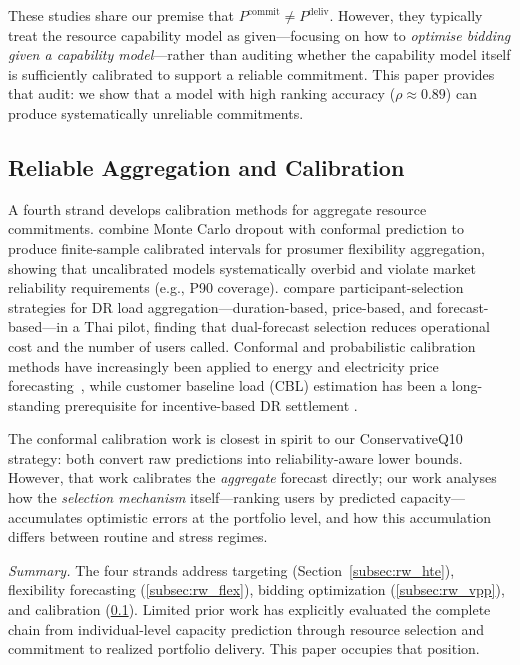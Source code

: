 \documentclass[utf8]{FrontiersinHarvard}
\newcommand{\Pcommit}{P^{\mathrm{commit}}}
\newcommand{\Pdeliv}{P^{\mathrm{deliv}}}
\begin{document}
These studies share our premise that
$\Pcommit \neq \Pdeliv$. However, they typically treat the
resource capability model as given---focusing on how to
\emph{optimise bidding given a capability model}---rather than
auditing whether the capability model itself is sufficiently
calibrated to support a reliable commitment. This paper
provides that audit: we show that a model with high ranking
accuracy ($\rho \approx 0.89$) can produce systematically unreliable
commitments.

\subsection{Reliable Aggregation and Calibration}
\label{subsec:rw_calib}

A fourth strand develops calibration methods for aggregate
resource commitments.
\citep{conformal2026prosumer} combine Monte Carlo dropout
with conformal prediction to produce finite-sample calibrated
intervals for prosumer flexibility aggregation, showing that
uncalibrated models systematically overbid and violate
market reliability requirements (e.g., P90 coverage).
\citep{prakobkaew2025selection} compare participant-selection
strategies for DR load aggregation---duration-based,
price-based, and forecast-based---in a Thai pilot, finding that
dual-forecast selection reduces operational cost and the number
of users called.
Conformal and probabilistic calibration methods have
increasingly been applied to energy and electricity price
forecasting~\citep{oconnor2025conformal}, while customer
baseline load (CBL) estimation has been a long-standing
prerequisite for incentive-based DR settlement
\citep{park2015cbl,li2025cbl}.

The conformal calibration work is closest in spirit to our
ConservativeQ10 strategy: both convert raw predictions into
reliability-aware lower bounds. However, that work calibrates
the \emph{aggregate} forecast directly; our work analyses how
the \emph{selection mechanism} itself---ranking users by
predicted capacity---accumulates optimistic errors at the
portfolio level, and how this accumulation differs between
routine and stress regimes.

\textit{Summary.} The four strands address targeting
(Section~\ref{subsec:rw_hte}), flexibility forecasting
(\ref{subsec:rw_flex}), bidding optimization
(\ref{subsec:rw_vpp}), and calibration
(\ref{subsec:rw_calib}). Limited prior work has explicitly evaluated the complete chain from individual-level capacity prediction through resource selection and commitment to realized portfolio delivery. This paper occupies that position.
\end{document}
